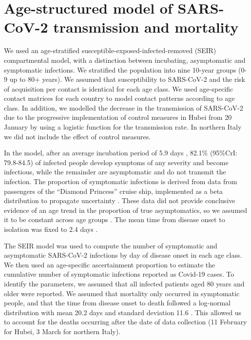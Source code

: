\documentclass{article}
\begin{document}
\section*{Age-structured model of SARS-CoV-2 transmission and mortality}

We used an age-stratified susceptible-exposed-infected-removed (SEIR) compartmental model, with a distinction between incubating, asymptomatic and symptomatic infections. 
We stratified the population into nine 10-year groups (0-9 up to 80+ years). 
We assumed that susceptibility to SARS-CoV-2 and the risk of acquisition per contact is identical for each age class. 
We used age-specific contact matrices for each country to model contact patterns according to age class. 
In addition, we modelled the decrease in the transmission of SARS-CoV-2 due to the progressive implementation of control measures in Hubei from 20 January by using a logistic function for the transmission rate. 
In northern Italy we did not include the effect of control measures.

In the model, after an average incubation period of 5.9 days \cite{Bi2020}, 82.1\% (95\%CrI: 79.8-84.5) of infected people develop symptoms of any severity and become infectious, while the remainder are asymptomatic and do not transmit the infection.
The proportion of symptomatic infections is derived from data from passengers of the ``Diamond Princess'' cruise ship, implemented as a beta distribution to propagate uncertainty \cite{mizumoto2020estimating}. 
These data did not provide conclusive evidence of an age trend in the proportion of true asymptomatics, so we assumed it to be constant across age groups \cite{JapaneseNationalInstituteofInfectiousDiseases2020}.
The mean time from disease onset to isolation was fixed to 2.4 days \cite{Bi2020}.

The SEIR model was used to compute the number of symptomatic and asymptomatic SARS-CoV-2 infections by day of disease onset in each age class.
We then used an age-specific ascertainment proportion to estimate the cumulative number of symptomatic infections reported as Covid-19 cases.
To identify the parameters, we assumed that all infected patients aged 80 years and older were reported.
We assumed that mortality only occurred in symptomatic people, and that the time from disease onset to death followed a log-normal distribution with mean 20.2 days and standard deviation 11.6 \cite{linton2020incubation}.
This allowed us to account for the deaths occurring after the date of data collection (11 February for Hubei, 3 March for northern Italy). 
\end{document}
